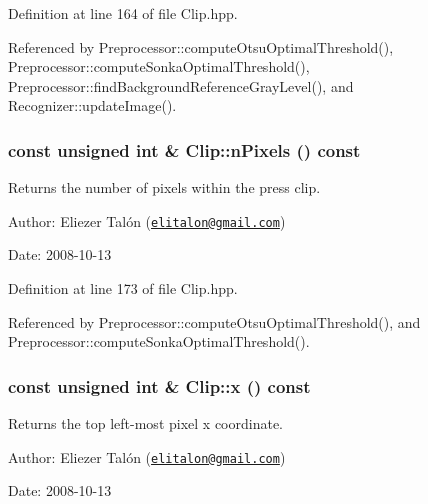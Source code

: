 Definition at line 164 of file Clip.hpp.

Referenced by Preprocessor::computeOtsuOptimalThreshold(), Preprocessor::computeSonkaOptimalThreshold(), Preprocessor::findBackgroundReferenceGrayLevel(), and Recognizer::updateImage().\hypertarget{class_clip_9acfff7074239516465bcca11586c48d}{
\subsubsection[nPixels]{\setlength{\rightskip}{0pt plus 5cm}const unsigned int \& Clip::nPixels () const}}
\label{class_clip_9acfff7074239516465bcca11586c48d}


Returns the number of pixels within the press clip. 

\begin{Desc}
\item[Author:]Eliezer Talón (\href{mailto:elitalon@gmail.com}{\tt elitalon@gmail.com}) \end{Desc}
\begin{Desc}
\item[Date:]2008-10-13 \end{Desc}


Definition at line 173 of file Clip.hpp.

Referenced by Preprocessor::computeOtsuOptimalThreshold(), and Preprocessor::computeSonkaOptimalThreshold().\hypertarget{class_clip_fcedad938315faff5d577670f9219c61}{
\subsubsection[x]{\setlength{\rightskip}{0pt plus 5cm}const unsigned int \& Clip::x () const}}
\label{class_clip_fcedad938315faff5d577670f9219c61}


Returns the top left-most pixel x coordinate. 

\begin{Desc}
\item[Author:]Eliezer Talón (\href{mailto:elitalon@gmail.com}{\tt elitalon@gmail.com}) \end{Desc}
\begin{Desc}
\item[Date:]2008-10-13 \end{Desc}



